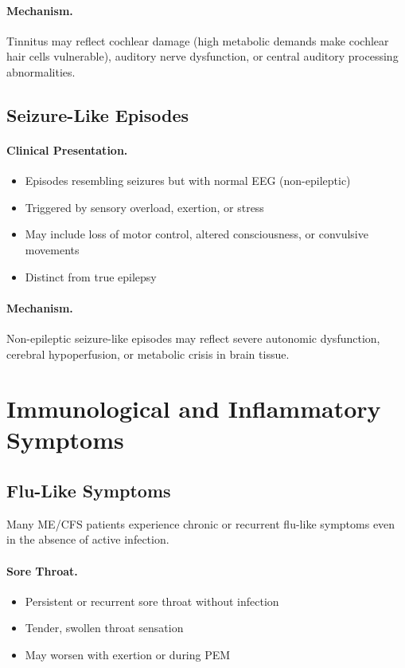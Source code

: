 \paragraph{Mechanism.}
Tinnitus may reflect cochlear damage (high metabolic demands make cochlear hair cells vulnerable), auditory nerve dysfunction, or central auditory processing abnormalities.

\subsection{Seizure-Like Episodes}
\label{subsec:seizures}

\paragraph{Clinical Presentation.}
\begin{itemize}
    \item Episodes resembling seizures but with normal EEG (non-epileptic)
    \item Triggered by sensory overload, exertion, or stress
    \item May include loss of motor control, altered consciousness, or convulsive movements
    \item Distinct from true epilepsy
\end{itemize}

\paragraph{Mechanism.}
Non-epileptic seizure-like episodes may reflect severe autonomic dysfunction, cerebral hypoperfusion, or metabolic crisis in brain tissue.

\section{Immunological and Inflammatory Symptoms}
\label{sec:immune-symptoms}

\subsection{Flu-Like Symptoms}
\label{subsec:flu-like}

Many ME/CFS patients experience chronic or recurrent flu-like symptoms even in the absence of active infection.

\paragraph{Sore Throat.}
\begin{itemize}
    \item Persistent or recurrent sore throat without infection
    \item Tender, swollen throat sensation
    \item May worsen with exertion or during PEM
\end{itemize}

